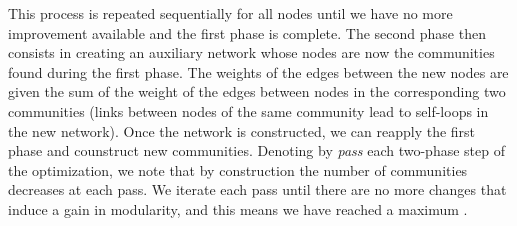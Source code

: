 This process is repeated sequentially for all nodes until we have no more improvement available and the first phase is complete.
The second phase then consists in creating an auxiliary network whose nodes are now the communities found during the first phase. The weights of the edges between the new nodes are given the sum of the weight of the edges between nodes in the corresponding two communities (links between nodes of the same community lead to self-loops in the new network). Once the network is constructed, we can reapply the first phase and counstruct new communities. Denoting by \textit{pass} each two-phase step of the optimization, we note that by construction the number of communities decreases at each pass. We iterate each pass until there are no more changes that induce a gain in modularity, and this means we have reached a maximum \cite{blondel2008louvain}.


\pagebreak
